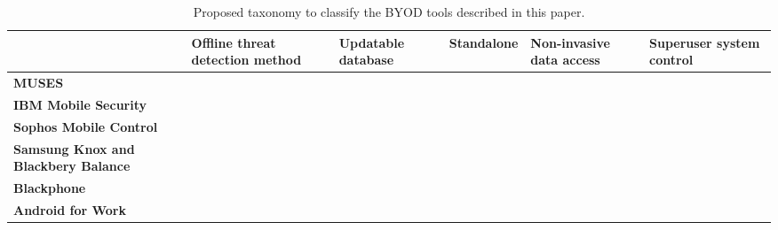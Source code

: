 \documentclass{article}
\newcommand{\cmark}{\ding{51}}%
\newcommand{\xmark}{\ding{55}}%
\newcommand{\nmark}{\scalebox{1.25}{\textbf{-}} }
\begin{document}
\begin{table}[ht]

  \centering
  \renewcommand{\arraystretch}{1.8}%
  \begin{tabular}{>{\centering\bfseries}m{0.8in} >{\centering}m{0.8in} >{\centering}m{0.8in} >{\centering}m{0.8in} >{\centering}m{0.8in} >{\centering\arraybackslash}m{0.8in}}
    \toprule
      & \textbf{Offline threat detection method} & \textbf{Updatable database} & \textbf{Standalone} & \textbf{Non-invasive data access} & \textbf{Superuser system control} \\
    \midrule
    MUSES & \cmark & \cmark & \cmark & \cmark & \cmark  \\
     \arrayrulecolor[gray]{0.8}\hline
    IBM Mobile Security & \xmark & \xmark & \cmark & \xmark & \xmark  \\
     \arrayrulecolor[gray]{0.8}\hline
    Sophos Mobile Control & \xmark & \xmark & \cmark & \nmark & \nmark \\
     \arrayrulecolor[gray]{0.8}\hline
    Samsung Knox and Blackbery Balance & \nmark & \nmark & \cmark & \nmark & \nmark\\
     \arrayrulecolor[gray]{0.8}\hline
    Blackphone & \nmark & \nmark & \cmark & \nmark & \nmark\\
     \arrayrulecolor[gray]{0.8}\hline
    Android for Work & \nmark & \nmark & \cmark & \nmark & \nmark\\
    \bottomrule
  \end{tabular}
  \caption{Proposed taxonomy to classify the BYOD tools described in this paper.}
\end{table}
\end{document}
